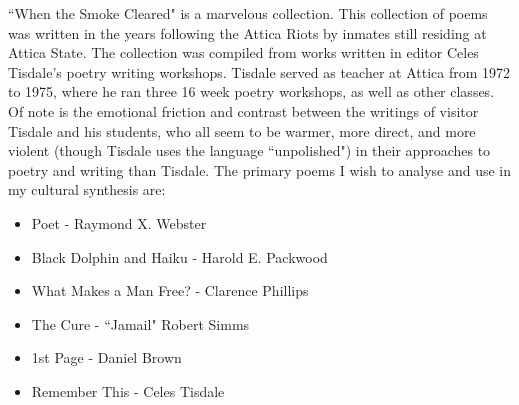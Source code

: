\documentclass[14pt, letterpaper]{article}
\begin{document}
\begin{adjustwidth}{2.5ex}{0pt}

  ``When the Smoke Cleared" is a marvelous collection. This 
  collection of poems was written in the years following the 
  Attica Riots by inmates still residing at Attica State. The 
  collection was compiled from works written in editor Celes 
  Tisdale's poetry writing workshops. Tisdale served as teacher 
  at Attica from 1972 to 1975, where he ran three 16 week poetry 
  workshops, as well as other classes. Of note is the emotional 
  friction and contrast between the writings of visitor Tisdale 
  and his students, who all seem to be warmer, more direct, and 
  more violent (though Tisdale uses the language 	``unpolished") 
  in their approaches to poetry and writing than Tisdale. The 
  primary poems I wish to analyse and use in my cultural synthesis 
  are: 
  \begin{itemize}
  
    \item Poet - Raymond X. Webster
    
    \item Black Dolphin and Haiku - Harold E. Packwood  
    
    \item What Makes a Man Free? - Clarence Phillips
    
    \item The Cure - ``Jamail" Robert Simms
    
    \item 1st Page - Daniel Brown
    
    \item Remember This - Celes Tisdale
  
  \end{itemize}
  
\end{adjustwidth}

\clearpage

\nocite{*}

\printbibliography
\end{document}
